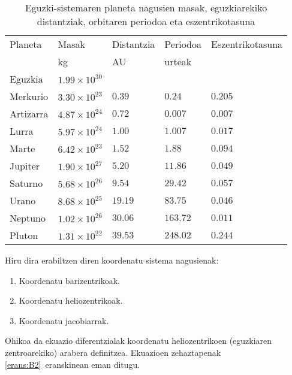 \begin{table} [h!]
\caption[Eguzki-sistemaren parametro nagusienak]{Eguzki-sistemaren planeta nagusien masak, eguzkiarekiko distantziak, orbitaren periodoa eta eszentrikotasuna}
\label{tab:eguz-sist}       %
\begin{tabular}{l l l l l} 
\hline
 Planeta   &  Masak                 & Distantzia   & Periodoa    & Eszentrikotasuna\\   
           &  kg                    & AU           &   urteak    &               \\ \hline
 Eguzkia   &  $1.99 \times 10^{30}$ &              &             &               \\         
 Merkurio  &  $3.30 \times 10^{23}$ & $0.39$       &  $0.24$     &  $0.205$      \\
 Artizarra &  $4.87 \times 10^{24}$ & $0.72$       &  $0.007$    &  $0.007$      \\
 Lurra     &  $5.97 \times 10^{24}$ & $1.00$       &  $1.007$    &  $0.017$      \\
 Marte     &  $6.42 \times 10^{23}$ & $1.52$       &  $1.88$     &  $0.094$      \\ \hline
 Jupiter   &  $1.90 \times 10^{27}$ & $5.20$       &  $11.86$    &  $0.049$      \\
 Saturno   &  $5.68 \times 10^{26}$ & $9.54$       &  $29.42$    &  $0.057$      \\
 Urano     &  $8.68 \times 10^{25}$ & $19.19$      &  $83.75$    &  $0.046$      \\
 Neptuno   &  $1.02 \times 10^{26}$ & $30.06$      &  $163.72$   &  $0.011$      \\
 Pluton    &  $1.31 \times 10^{22}$ & $39.53$      &  $248.02$   &  $0.244$      \\
\hline
\end{tabular}
\end{table}

Hiru dira erabiltzen diren koordenatu sistema nagusienak:
\begin{enumerate}
\item Koordenatu barizentrikoak.
\item Koordenatu heliozentrikoak.
\item Koordenatu jacobiarrak.
\end{enumerate}

Ohikoa da ekuazio diferentzialak koordenatu heliozentrikoen (eguzkiaren zentroarekiko) arabera definitzea. 
Ekuazioen zehaztapenak \ref{erans:B2}~eranskinean eman ditugu.


